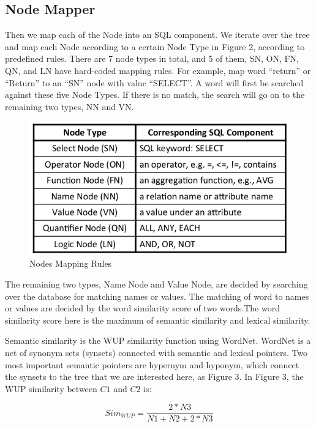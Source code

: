 \documentclass[twocolumn]{article}
\begin{document}
\subsection{Node Mapper}
Then we map each of the Node into an SQL component. We iterate over the tree and map each Node according to a certain Node Type in Figure 2, according to predefined rules. There are 7 node types in total, and 5 of them, SN, ON, FN, QN, and LN have hard-coded mapping rules. For example, map word “return” or “Return” to an “SN” node with value “SELECT”. A word will first be searched against these five Node Types. If there is no match, the search will go on to the remaining two types, NN and VN.

\begin{figure}[ht]
  \centering
  \includegraphics[width=0.9\linewidth]{figures/nodes_mapping_rules.png}
  \caption[caption for nodes mapping rules]{Nodes Mapping Rules\protect\footnotemark}
\end{figure}

The remaining two types, Name Node and Value Node, are decided by searching over the database for matching names or values. The matching of word to names or values are decided by the word similarity score of two words.The word similarity score here is the maximum of semantic similarity and lexical similarity.

Semantic similarity is the WUP similarity\cite{wu1994verbs} function using WordNet. WordNet is a net of synonym sets (synsets) connected with semantic and lexical pointers. Two most important semantic pointers are hypernym and hyponym, which connect the synsets to the tree that we are interested here, as Figure 3. In Figure 3, the WUP similarity between $C1$ and $C2$ is:

$$ Sim_{WUP} = \frac{2*N3}{N1+N2+2*N3} $$
\end{document}

